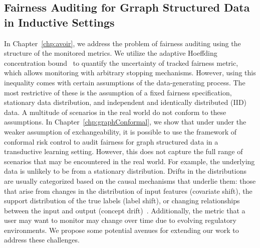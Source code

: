 \subsection{Fairness Auditing for Grraph Structured Data in Inductive Settings}
In Chapter~\ref{chp:avoir}, we address the problem of fairness auditing using the structure of the monitored metrics.
We utilize the adaptive Hoeffding concentration bound~\cite{zhao2016adaptive} to quantify the uncertainty of tracked fairness metric, which allows monitoring with arbitrary stopping mechanisms.
However, using this inequality comes with certain assumptions of the data-generating process.
The most restrictive of these is the assumption of a fixed fairness specification, stationary data distribution, and independent and identically distributed (IID) data.
A multitude of scenarios in the real world do not conform to these assumptions.
In Chapter~\ref{chp:graphConformal}, we show that under under the weaker assumption of exchangeability, it is possible to use the framework of conformal risk control to audit fairness for graph structured data in a transductive learning setting.
However, this does not capture the full range of scenarios that may be encountered in the real world.
For example, the underlying data is unlikely to be from a stationary distribution.
Drifts in the distributions are usually categorized based on the causal mechanisms that underlie them:
those that arise from changes in the distribution of input features (covariate shift), the support distribution of the true labels (label shift), or changing relationships between the input and output (concept drift)~\citep{huyen2022designing}.
Additionally, the metric that a user may want to monitor may change over time due to evolving regulatory environments.
We propose some potential avenues for extending our work to address these challenges.
